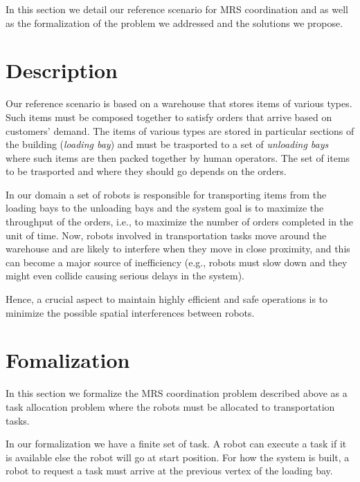 In this section we detail our reference scenario for MRS coordination and as well 
as the formalization of the problem we addressed and the solutions we propose.

\section{Description}
Our reference scenario is based on a warehouse that stores items of various types.
Such items must be composed together to satisfy orders that arrive based on customers’ demand.
The items of various types are stored in particular sections of the building (\textit{loading bay})
and must be trasported to a set of \textit{unloading bays} where such items are then 
packed together by human operators. The set of items to be trasported and where they should
go depends on the orders.

In our domain a set of robots is responsible for transporting items from
the loading bays to the unloading bays and the system goal is to maximize the
throughput of the orders, i.e., to maximize the number of orders completed in
the unit of time. Now, robots involved in transportation tasks move around
the warehouse and are likely to interfere when they move in close proximity,
and this can become a major source of inefficiency (e.g., robots must slow down
and they might even collide causing serious delays in the system).

Hence, a crucial aspect to maintain highly efficient and safe operations is to minimize the
possible spatial interferences between robots.


\section{Fomalization}
In this section we formalize the MRS coordination problem described above as a task allocation problem
where the robots must be allocated to transportation tasks. 

In our formalization we have a finite set of task. A robot can execute a task if it is available else the robot will go at start position.
For how the system is built, a robot to request a task must arrive at the previous vertex of the loading bay.

